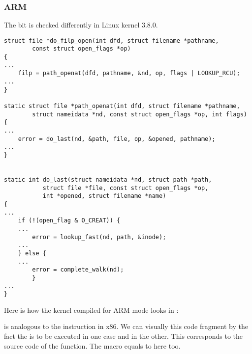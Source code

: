 \subsubsection{ARM}


The  bit is checked differently in Linux kernel 3.8.0.

\begin{lstlisting}[caption=linux kernel 3.8.0,style=customc]
struct file *do_filp_open(int dfd, struct filename *pathname,
		const struct open_flags *op)
{
...
	filp = path_openat(dfd, pathname, &nd, op, flags | LOOKUP_RCU);
...
}

static struct file *path_openat(int dfd, struct filename *pathname,
		struct nameidata *nd, const struct open_flags *op, int flags)
{
...
	error = do_last(nd, &path, file, op, &opened, pathname);
...
}


static int do_last(struct nameidata *nd, struct path *path,
		   struct file *file, const struct open_flags *op,
		   int *opened, struct filename *name)
{
...
	if (!(open_flag & O_CREAT)) {
    ...
		error = lookup_fast(nd, path, &inode);
    ...
	} else {
    ...
		error = complete_walk(nd);
        }
...
}
\end{lstlisting}

Here is how the kernel compiled for ARM mode looks in \IDA:



 is analogous to the \TEST instruction in x86.
We can  visually this code fragment by the fact the 
 is to be executed in one case and  in the other.
This corresponds to the source code of the  function.
The  macro equals to  here too.

